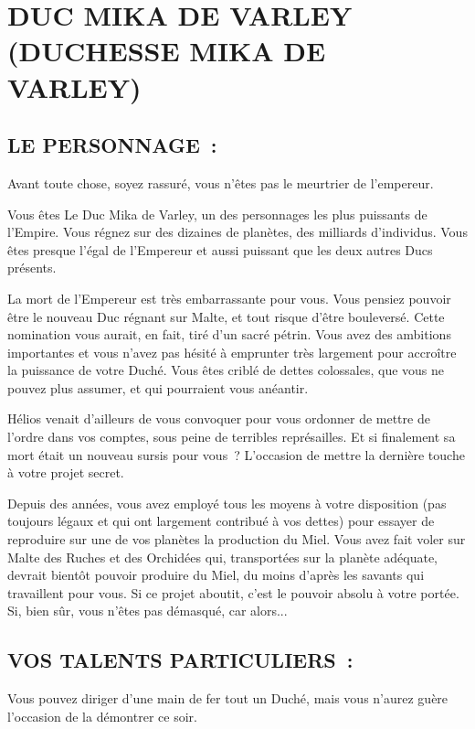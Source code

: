 \documentclass[14pt,twocolumn]{extarticle}
\begin{document}
\section{DUC MIKA DE VARLEY\\(DUCHESSE MIKA DE VARLEY)}

\subsection{LE PERSONNAGE~:}

Avant toute chose, soyez rassuré, vous n’êtes pas le meurtrier de l'empereur.

Vous êtes Le Duc Mika de Varley, un des personnages les plus puissants de
l’Empire. Vous régnez sur des dizaines de planètes, des milliards d’individus.
Vous êtes presque l’égal de l’Empereur et aussi puissant que les deux autres
Ducs présents.

La mort de l’Empereur est très embarrassante pour vous. Vous pensiez pouvoir
être le nouveau Duc régnant sur Malte, et tout risque d’être bouleversé. Cette
nomination vous aurait, en fait, tiré d’un sacré pétrin. Vous avez des
ambitions importantes et vous n’avez pas hésité à emprunter très largement pour
accroître la puissance de votre Duché. Vous êtes criblé de dettes colossales,
que vous ne pouvez plus assumer, et qui pourraient vous anéantir.

Hélios venait d’ailleurs de vous convoquer pour vous ordonner de mettre de
l’ordre dans vos comptes, sous peine de terribles représailles. Et si
finalement sa mort était un nouveau sursis pour vous~? L’occasion de mettre la
dernière touche à votre projet secret.

Depuis des années, vous avez employé tous les moyens à votre disposition
(pas toujours légaux et qui ont largement contribué à vos dettes) pour essayer
de reproduire sur une de vos planètes la production du Miel. Vous avez fait
voler sur Malte des Ruches et des Orchidées qui, transportées sur la planète
adéquate, devrait bientôt pouvoir produire du Miel, du moins d’après les
savants qui travaillent pour vous. Si ce projet aboutit, c’est le pouvoir
absolu à votre portée. Si, bien sûr, vous n’êtes pas démasqué, car alors...

\subsection{VOS TALENTS PARTICULIERS~:}

Vous pouvez diriger d’une main de fer tout un Duché, mais vous n’aurez guère
l’occasion de la démontrer ce soir.
\end{document}
